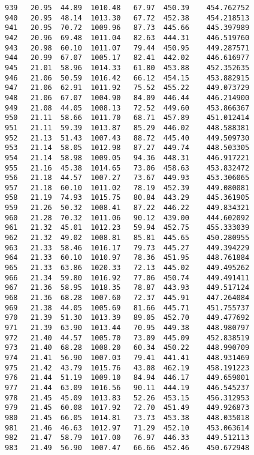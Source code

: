 \documentclass[11pt]{article}
\begin{document}
\begin{tcolorbox}[breakable, size=fbox, boxrule=.5pt, pad at break*=1mm, opacityfill=0]
\begin{Verbatim}[commandchars=\\\{\}]
939   20.95  44.89  1010.48   67.97  450.39    454.762752
940   20.95  48.14  1013.30   67.72  452.38    454.218513
941   20.95  70.72  1009.96   87.73  445.66    445.397989
942   20.96  69.48  1011.04   82.63  444.31    446.519760
943   20.98  60.10  1011.07   79.44  450.95    449.287571
944   20.99  67.07  1005.17   82.41  442.02    446.616977
945   21.01  58.96  1014.33   61.80  453.88    452.352635
946   21.06  50.59  1016.42   66.12  454.15    453.882915
947   21.06  62.91  1011.92   75.52  455.22    449.073729
948   21.06  67.07  1004.90   84.09  446.44    446.214900
949   21.08  44.05  1008.13   72.52  449.60    453.866367
950   21.11  58.66  1011.70   68.71  457.89    451.012414
951   21.11  59.39  1013.87   85.29  446.02    448.588381
952   21.13  51.43  1007.43   88.72  445.40    449.509730
953   21.14  58.05  1012.98   87.27  449.74    448.503305
954   21.14  58.98  1009.05   94.36  448.31    446.917221
955   21.16  45.38  1014.65   73.06  458.63    453.832472
956   21.18  44.57  1007.27   73.67  449.93    453.306065
957   21.18  60.10  1011.02   78.19  452.39    449.080081
958   21.19  74.93  1015.75   80.84  443.29    445.361905
959   21.26  50.32  1008.41   87.22  446.22    449.834321
960   21.28  70.32  1011.06   90.12  439.00    444.602092
961   21.32  45.01  1012.23   59.94  452.75    455.333039
962   21.32  49.02  1008.81   85.81  445.65    450.280955
963   21.33  58.46  1016.17   79.73  445.27    449.394229
964   21.33  60.10  1010.97   78.36  451.95    448.761884
965   21.33  63.86  1020.33   72.13  445.02    449.495262
966   21.34  59.80  1016.92   77.06  450.74    449.491411
967   21.36  58.95  1018.35   78.87  443.93    449.517124
968   21.36  68.28  1007.60   72.37  445.91    447.264084
969   21.38  44.05  1005.69   81.66  445.71    451.755737
970   21.39  51.30  1013.39   89.05  452.70    449.477692
971   21.39  63.90  1013.44   70.95  449.38    448.980797
972   21.40  44.57  1005.70   73.09  445.09    452.838519
973   21.40  68.28  1008.20   60.34  450.22    448.990709
974   21.41  56.90  1007.03   79.41  441.41    448.931469
975   21.42  43.79  1015.76   43.08  462.19    458.191223
976   21.44  51.19  1009.10   84.94  446.17    449.659001
977   21.44  63.09  1016.56   90.11  444.19    446.545237
978   21.45  45.09  1013.83   52.26  453.15    456.312953
979   21.45  60.08  1017.92   72.70  451.49    449.926873
980   21.45  66.05  1014.81   73.73  453.38    448.035018
981   21.46  46.63  1012.97   71.29  452.10    453.063614
982   21.47  58.79  1017.00   76.97  446.33    449.512113
983   21.49  56.90  1007.47   66.66  452.46    450.672948

\end{Verbatim}
\end{tcolorbox}
\end{document}
